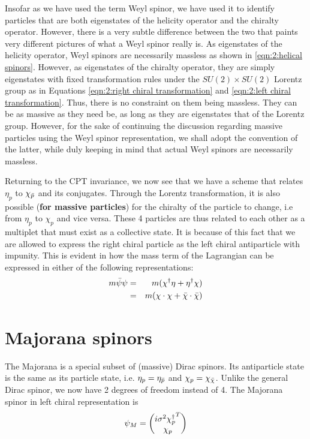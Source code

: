 Insofar as we have used the term Weyl spinor, we have used it to identify particles that are both eigenstates of the helicity operator and the chiralty operator. However, there is a very subtle difference between the two that paints very different pictures of what a Weyl spinor really is. As eigenstates of the helicity operator, Weyl spinors are necessarily massless as shown in \ref{eqn:2:helical spinors}. However, as eigenstates of the chiralty operator, they are simply eigenstates with fixed transformation rules under the $SU(2) \times SU(2)$ Lorentz group as in Equations \ref{eqn:2:right chiral transformation} and \ref{eqn:2:left chiral transformation}. Thus, there is no constraint on them being massless. They can be as massive as they need be, as long as they are eigenstates that of the Lorentz group. However, for the sake of continuing the discussion regarding massive particles using the Weyl spinor representation, we shall adopt the convention of the latter, while duly keeping in mind that actual Weyl spinors are necessarily massless.

Returning to the CPT invariance, we now see that we have a scheme that relates $\eta_p$ to $\chi_{\Bar{p}}$ and its conjugates. Through the Lorentz transformation, it is also possible (\textbf{for massive particles}) for the chiralty of the particle to change, i.e from $\eta_p$ to $\chi_p$ and vice versa. These 4 particles are thus related to each other as a multiplet that must exist as a collective state. It is because of this fact that we are allowed to express the right chiral particle as the left chiral antiparticle with impunity. This is evident in how the mass term of the Lagrangian can be expressed in either of the following representations:
\begin{eqnarray}
    m \Bar{\psi}\psi
    &=& m (\chi^\dagger \eta + \eta^\dagger \chi) \nonumber \\
    &=& m (\chi\cdot\chi + \Bar{\chi}\cdot\Bar{\chi})
\end{eqnarray}

\section{Majorana spinors}
\label{ch:4:majorana}
The Majorana is a special subset of (massive) Dirac spinors. Its antiparticle state is the same as its particle state, i.e. $\eta_p = \eta_{\Bar{p}}$ and $\chi_p = \chi_{\Bar{\chi}}$. Unlike the general Dirac spinor, we now have 2 degrees of freedom instead of 4. The Majorana spinor in left chiral representation is
\begin{equation}
    \psi_M = \begin{pmatrix}{i \sigma^2 {\chi_p^\dagger}^T}\\{\chi_p}\end{pmatrix}
\end{equation}

